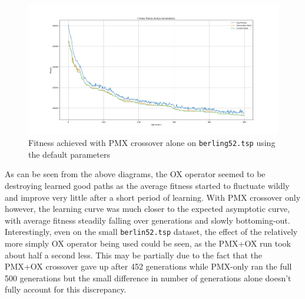 \documentclass[a4paper]{article}
\begin{document}
\begin{figure}[H]
    \centering
    \includegraphics[width=\textwidth]{./images/berlin52_defaults_pmxonly.png}
\caption{Fitness achieved with PMX crossover alone on \texttt{berling52.tsp} using the default parameters}
\end{figure}

As can be seen from the above diagrams, the OX operator seemed to be destroying learned good paths as the average fitness started to fluctuate wildly and improve very little after a short period of learning.
With PMX crossover only however, the learning curve was much closer to the expected asymptotic curve, with average fitness steadily falling over generations and slowly bottoming-out.
Interestingly, even on the small \verb|berlin52.tsp| dataset, the effect of the relatively more simply OX operator being used could be seen, as the PMX+OX run took about half a second less.
This may be partially due to the fact that the PMX+OX crossover gave up after 452 generations while PMX-only ran the full 500 generations but the small difference in number of generations alone doesn't fully account for this discrepancy.
\end{document}
